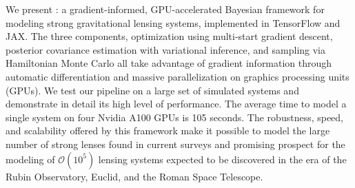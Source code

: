 We present \gigalens: a gradient-informed, GPU-accelerated Bayesian framework for modeling strong gravitational lensing systems, implemented in TensorFlow and JAX.  The three components, optimization using multi-start gradient descent, posterior covariance estimation with variational inference, and 
sampling via Hamiltonian Monte Carlo\agu{,} all take advantage of gradient information through automatic differentiation and massive parallelization on graphics processing units (GPUs). 
We test our pipeline on a large set of simulated systems and demonstrate in detail its high level of performance.  
The average time to model a single system on four Nvidia A100 GPUs is 105 seconds.  
The 
robustness, speed, and scalability offered by this framework make it possible to model the large number of strong lenses found in current surveys and  promising prospect for the modeling of 
$\mathcal{O} (10^5)$ lensing systems expected to be discovered in the era of the  Rubin Observatory, Euclid, and the  Roman Space Telescope.

